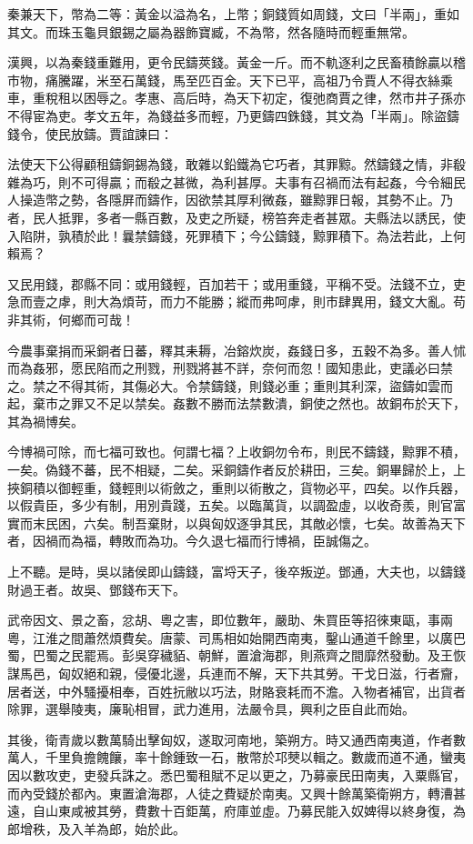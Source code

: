 \begin{pinyinscope}
秦兼天下，幣為二等：黃金以溢為名，上幣；銅錢質如周錢，文曰「半兩」，重如其文。而珠玉龜貝銀錫之屬為器飾寶臧，不為幣，然各隨時而輕重無常。

漢興，以為秦錢重難用，更令民鑄莢錢。黃金一斤。而不軌逐利之民畜積餘贏以稽市物，痛騰躍，米至石萬錢，馬至匹百金。天下已平，高祖乃令賈人不得衣絲乘車，重稅租以困辱之。孝惠、高后時，為天下初定，復弛商賈之律，然市井子孫亦不得宦為吏。孝文五年，為錢益多而輕，乃更鑄四銖錢，其文為「半兩」。除盜鑄錢令，使民放鑄。賈誼諫曰：

法使天下公得顧租鑄銅錫為錢，敢雜以鉛鐵為它巧者，其罪黥。然鑄錢之情，非殽雜為巧，則不可得贏；而殽之甚微，為利甚厚。夫事有召禍而法有起姦，今令細民人操造幣之勢，各隱屏而鑄作，因欲禁其厚利微姦，雖黥罪日報，其勢不止。乃者，民人抵罪，多者一縣百數，及吏之所疑，榜笞奔走者甚眾。夫縣法以誘民，使入陷阱，孰積於此！曩禁鑄錢，死罪積下；今公鑄錢，黥罪積下。為法若此，上何賴焉？

又民用錢，郡縣不同：或用錢輕，百加若干；或用重錢，平稱不受。法錢不立，吏急而壹之虖，則大為煩苛，而力不能勝；縱而弗呵虖，則市肆異用，錢文大亂。苟非其術，何鄉而可哉！

今農事棄捐而采銅者日蕃，釋其耒耨，冶鎔炊炭，姦錢日多，五穀不為多。善人怵而為姦邪，愿民陷而之刑戮，刑戮將甚不詳，奈何而忽！國知患此，吏議必曰禁之。禁之不得其術，其傷必大。令禁鑄錢，則錢必重；重則其利深，盜鑄如雲而起，棄市之罪又不足以禁矣。姦數不勝而法禁數潰，銅使之然也。故銅布於天下，其為禍博矣。

今博禍可除，而七福可致也。何謂七福？上收銅勿令布，則民不鑄錢，黥罪不積，一矣。偽錢不蕃，民不相疑，二矣。采銅鑄作者反於耕田，三矣。銅畢歸於上，上挾銅積以御輕重，錢輕則以術斂之，重則以術散之，貨物必平，四矣。以作兵器，以假貴臣，多少有制，用別貴踐，五矣。以臨萬貨，以調盈虛，以收奇羨，則官富實而末民困，六矣。制吾棄財，以與匈奴逐爭其民，其敵必懷，七矣。故善為天下者，因禍而為福，轉敗而為功。今久退七福而行博禍，臣誠傷之。

上不聽。是時，吳以諸侯即山鑄錢，富埒天子，後卒叛逆。鄧通，大夫也，以鑄錢財過王者。故吳、鄧錢布天下。

武帝因文、景之畜，忿胡、粵之害，即位數年，嚴助、朱買臣等招徠東甌，事兩粵，江淮之間蕭然煩費矣。唐蒙、司馬相如始開西南夷，鑿山通道千餘里，以廣巴蜀，巴蜀之民罷焉。彭吳穿穢貊、朝鮮，置滄海郡，則燕齊之間靡然發動。及王恢謀馬邑，匈奴絕和親，侵優北邊，兵連而不解，天下共其勞。干戈日滋，行者齎，居者送，中外騷擾相奉，百姓抏敝以巧法，財賂衰耗而不澹。入物者補官，出貨者除罪，選舉陵夷，廉恥相冒，武力進用，法嚴令具，興利之臣自此而始。

其後，衛青歲以數萬騎出擊匈奴，遂取河南地，築朔方。時又通西南夷道，作者數萬人，千里負擔餽饟，率十餘鍾致一石，散幣於邛僰以輯之。數歲而道不通，蠻夷因以數攻吏，吏發兵誅之。悉巴蜀租賦不足以更之，乃募豪民田南夷，入粟縣官，而內受錢於都內。東置滄海郡，人徒之費疑於南夷。又興十餘萬築衛朔方，轉漕甚遠，自山東咸被其勞，費數十百鉅萬，府庫並虛。乃募民能入奴婢得以終身復，為郎增秩，及入羊為郎，始於此。


\end{pinyinscope}

